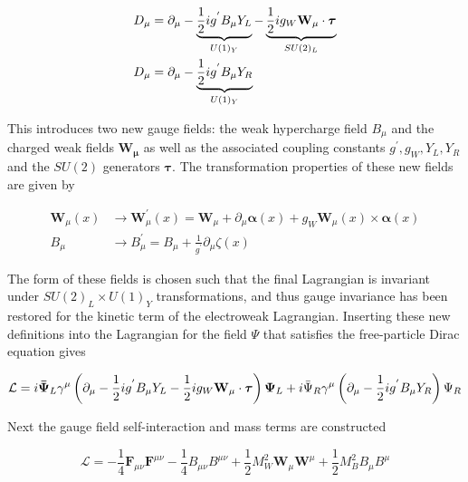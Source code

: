 \begin{align} 
\label{eq:gsw:left} 
D_\mu &= \partial_{\mu}
- \underbrace{\frac{1}{2}ig^{'}B_{\mu}Y_{L}}_{U(1)_Y} -
  \underbrace{\frac{1}{2}ig_{W}\bf{W}_\mu \cdot \boldsymbol{\tau}}_{SU(2)_L} \\
\label{eq:gsw:right} 
D_\mu &= \partial_{\mu}  - \underbrace{\frac{1}{2}ig^{'}B_{\mu}Y_{R}}_{U(1)_Y} 
\end{align}

This introduces two new gauge fields: the weak hypercharge field $B_\mu$ and
the charged weak fields $\boldsymbol{W_\mu}$ as well as the associated coupling
constants $g^{'}, g_{W}, Y_{L}, Y_{R}$ and the $SU(2)$ generators
$\boldsymbol{\tau}$.  The transformation properties of these new fields are
given by

\begin{align}
\label{eq:gsw:w_transform}
\boldsymbol{W}_{\mu}(x) &\rightarrow \boldsymbol{W}_{\mu}^{'}(x) =
\boldsymbol{W}_{\mu} + \partial_{\mu} \boldsymbol{\alpha}(x) +
g_{W}\boldsymbol{W}_{\mu}(x) \times \boldsymbol{\alpha}(x)
\\ 
\label{eq:gsw:b_transform}
B_{\mu} &\rightarrow B_{\mu}^{'} = B_{\mu} +
\frac{1}{g^{'}}\partial_{\mu}\zeta(x)
\end{align}

The form of these fields is chosen such that the final Lagrangian is invariant
under $SU(2)_L \times U(1)_Y$ transformations, and thus gauge invariance has
been restored for the kinetic term of the electroweak Lagrangian.  Inserting
these new definitions into the Lagrangian for the field $\Psi$ that satisfies
the free-particle Dirac equation gives

\begin{equation} \label{eq:gsw:fermion_lagrangian}
\mathcal{L} = i\boldsymbol{\bar{\Psi}}_{L}\gamma^{\mu} \left( \partial_{\mu}
- \frac{1}{2}ig^{'}B_{\mu}Y_{L} - \frac{1}{2}ig_{W}\bf{W}_\mu \cdot
  \boldsymbol{\tau} \right) \boldsymbol{\Psi}_{L} + i \bar{\Psi}_{R}\gamma^{\mu}
\left(\partial_{\mu} - \frac{1}{2}ig^{'}B_{\mu}Y_{R} \right) \Psi_{R}
\end{equation}

Next the gauge field self-interaction and mass terms are constructed

\begin{equation} \label{eq:gsw:gauge_lagrangian}
\mathcal{L} = -\frac{1}{4}\boldsymbol{F}_{\mu\nu}\boldsymbol{F}^{\mu\nu}
-\frac{1}{4}B_{\mu\nu}B^{\mu\nu} +
\frac{1}{2}M_{W}^{2}\boldsymbol{W}_{\mu}\boldsymbol{W}^{\mu} +
\frac{1}{2}M_{B}^{2}B_{\mu}B^{\mu}
\end{equation}

